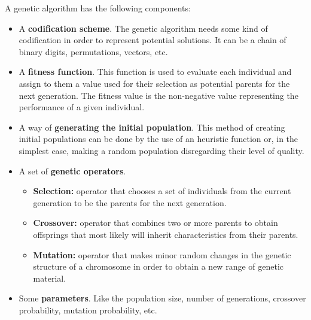 \documentclass[]{llncs}
\begin{document}
A genetic algorithm has the following components:
\begin{itemize}
    \item A \textbf{codification scheme}. The genetic algorithm needs some kind of codification in order to represent potential solutions. It can be a chain of binary digits, permutations, vectors, etc. 
    \item A \textbf{fitness function}. This function is used to evaluate each individual and assign to them a value used for their selection as potential parents for the next generation. The fitness value is the non-negative value representing the performance of a given individual.
    \item A way of \textbf{generating the initial population}. This method of creating initial populations can be done by the use of an heuristic function or, in the simplest case, making a random population disregarding their level of quality.
    \item A set of \textbf{genetic operators}. 
    \begin{itemize}
        \item \textbf{Selection:} operator that chooses a set of individuals from the current generation to be the parents for the next generation.
        \item \textbf{Crossover:} operator that combines two or more parents to obtain offsprings that most likely will inherit characteristics from their parents.
        \item \textbf{Mutation:} operator that makes minor random changes in the genetic structure of a chromosome in order to obtain a new range of genetic material.
    \end{itemize}
    \item Some \textbf{parameters}. Like the population size, number of generations, crossover probability, mutation probability, etc.
\end{itemize}
\end{document}
